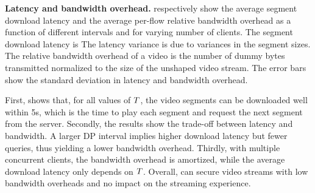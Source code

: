 \textbf{Latency and bandwidth overhead.}
 respectively show the
average segment download latency and the average per-flow relative bandwidth
overhead as a function of different intervals and for varying number of clients.
The {\base} segment download latency is  The latency
variance is due to variances in the segment sizes.
The relative bandwidth overhead of a video is the
number of dummy bytes transmitted normalized to the size of the unshaped video
stream.
The error bars show the standard deviation in latency and bandwidth overhead.

First,  shows that, for all values of $T$,
the video segments can be downloaded well within 5s, which is the time to play
each segment and request the next segment from the server.
Secondly, the results show the trade-off between latency and bandwidth. A larger
DP interval implies higher download latency but fewer queries, thus
yielding a lower bandwidth overhead.
Thirdly, with multiple concurrent clients, the bandwidth overhead is
amortized, while the average download latency only depends on $T$.
Overall, {\sys} can secure video streams with low bandwidth overheads
and no impact on the streaming experience.


